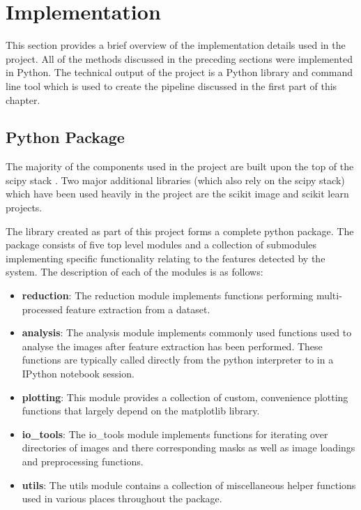 \section{Implementation}
\label{sec:implementation}
This section provides a brief overview of the implementation details used in the project. All of the methods discussed in the preceding sections were implemented in Python. The technical output of the project is a Python library and command line tool which is used to create the pipeline discussed in the first part of this chapter.

\subsection{Python Package}
The majority of the components used in the project are built upon the top of the scipy stack \cite{jones2014scipy}. Two major additional libraries (which also rely on the scipy stack) which have been used heavily in the project are the scikit image \cite{van2014scikit} and scikit learn \cite{pedregosa2011scikit} projects.

The library created as part of this project forms a complete python package. The package consists of five top level modules and a collection of submodules implementing specific functionality relating to the features detected by the system. The description of each of the modules is as follows:

\begin{itemize}
	\item {\bf reduction}: The reduction module implements functions performing multi-processed feature extraction from a dataset.
	\item {\bf analysis}: The analysis module implements commonly used functions used to analyse the images after feature extraction has been performed. These functions are typically called directly from the python interpreter to in a IPython notebook session.
	\item {\bf plotting}: This module provides a collection of custom, convenience plotting functions that largely depend on the matplotlib library.
	\item {\bf io\_tools}: The io\_tools module implements functions for iterating over directories of images and there corresponding masks as well as image loadings and preprocessing functions.
	\item {\bf utils}: The utils module contains a collection of miscellaneous helper functions used in various places throughout the package.
\end{itemize}

